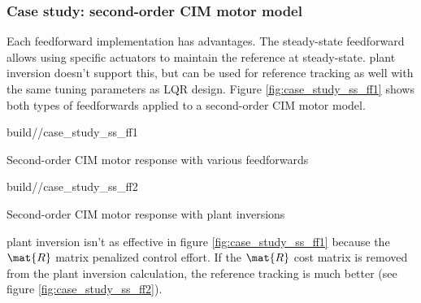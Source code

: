 \subsubsection{Case study: second-order CIM motor model}

Each feedforward implementation has advantages. The steady-state feedforward
allows using specific actuators to maintain the \gls{reference} at steady-state.
\Gls{plant} inversion doesn't support this, but can be used for \gls{reference}
\gls{tracking} as well with the same tuning parameters as LQR design. Figure
\ref{fig:case_study_ss_ff1} shows both types of feedforwards applied to a
second-order CIM motor model.
\begin{bookfigure}
  \begin{minisvg}{2}{build/\partpath/case_study_ss_ff1}
    \caption{Second-order CIM motor response with various feedforwards}
    \label{fig:case_study_ss_ff1}
  \end{minisvg}
  \hfill
  \begin{minisvg}{2}{build/\partpath/case_study_ss_ff2}
    \caption{Second-order CIM motor response with plant inversions}
    \label{fig:case_study_ss_ff2}
  \end{minisvg}
\end{bookfigure}

\Gls{plant} inversion isn't as effective in figure \ref{fig:case_study_ss_ff1}
because the $\mat{R}$ matrix penalized \gls{control effort}. If the $\mat{R}$
cost matrix is removed from the \gls{plant} inversion calculation, the
\gls{reference} \gls{tracking} is much better (see figure
\ref{fig:case_study_ss_ff2}).
